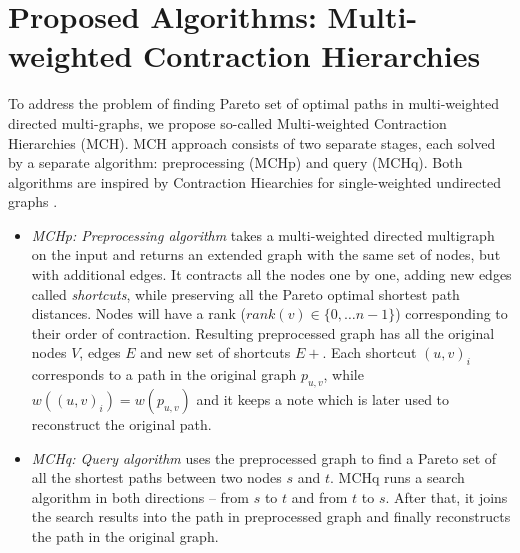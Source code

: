 
\section{Proposed Algorithms: Multi-weighted Contraction Hierarchies}
\label{secAlgorithms}

To address the problem of finding Pareto set of optimal paths in multi-weighted directed multi-graphs, we propose so-called Multi-weighted Contraction Hierarchies (MCH). 
MCH approach consists of two separate stages, each solved by a separate algorithm: preprocessing (MCHp) and query (MCHq). 
Both algorithms are inspired by Contraction Hiearchies for single-weighted undirected graphs \cite{geisberger2008contraction}.

\begin{itemize}
  \item {\em MCHp: Preprocessing algorithm} takes a multi-weighted directed multigraph on the input and returns an extended graph with the same set of nodes, but with additional edges. It contracts all the nodes one by one, adding new edges called \emph{shortcuts}, while preserving all the Pareto optimal shortest path distances. 
Nodes will have a rank ($rank(v) \in \{0, \dots n-1\}$) corresponding to their order of contraction.
Resulting preprocessed graph has all the original nodes $V$, edges $E$ and new set of shortcuts $E+$.
Each shortcut $(u,v)_i$ corresponds to a path in the original graph $p_{u,v}$, while $w((u,v)_i) = w(p_{u,v})$ and it keeps a note which is later used to reconstruct the original path.
  \item {\em MCHq: Query algorithm} uses the preprocessed graph to find a Pareto set of all
the shortest paths between two nodes $s$ and $t$. MCHq runs a search algorithm in both directions -- from $s$ to $t$ and from $t$ to $s$. After that, it joins the search results into the path in preprocessed graph and finally reconstructs the path in the original graph. 
\end{itemize}




